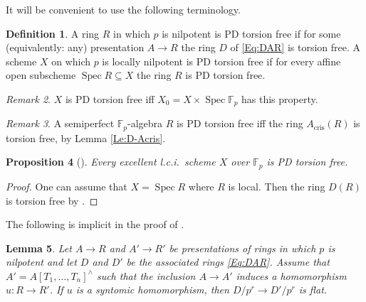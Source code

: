 \documentclass[a4paper,11pt]{article}
\theoremstyle{plain}
\newtheorem{Lemma}{Lemma}
\newtheorem{Prop}[Lemma]{Proposition}
\theoremstyle{definition}
\newtheorem{Defn}[Lemma]{Definition}
\theoremstyle{remark}
\newtheorem{Remark}[Lemma]{Remark}
\theoremstyle{definition}
\numberwithin{Lemma}{section}
\numberwithin{Subpoint}{Lemma}
\numberwithin{equation}{section}
\newcommand{\FF}{{\mathbb{F}}}
\DeclareMathOperator{\Spec}{Spec}
\DeclareMathOperator{\cris}{cris}
\newcommand{\chang}[1]{{#1}}
\begin{document}
It will be convenient to use the following terminology.

\begin{Defn}
\label{Def:PD-tor}
A ring $R$ in which $p$ is nilpotent is PD torsion free 
if for some (equivalently: any) presentation $A\to R$ the ring $D$
of \eqref{Eq:DAR} is torsion free.
A scheme $X$ on which $p$ is locally nilpotent is PD torsion free 
if for \chang{every} affine open subscheme $\Spec R\subseteq X$ 
the ring $R$ is PD torsion free.
\end{Defn}

\begin{Remark}
\chang{$X$ is PD torsion free iff $X_0=X\times\Spec\FF_p$
has this property.}
\end{Remark}

\begin{Remark}
\label{Re:semiperf-pdtorsion}
\chang{A semiperfect $\FF_p$-algebra $R$ is PD torsion free iff the ring $A_{\cris}(R)$ is torsion free, by Lemma \ref{Le:D-Acris}.}
\end{Remark}

\begin{Prop}[\cite{Jong-Messing}]
\label{Pr:PD-tor-lci}
\chang{Every} excellent l.c.i.\ scheme $X$ over $\FF_p$ is PD torsion free.
\end{Prop}

\begin{proof}
One can assume that $X=\Spec R$ where $R$ is local.
Then the ring $D(R)$ is torsion free by 
\cite[Lemma 4.7]{Jong-Messing}.
\end{proof}

The following is implicit in the proof of \cite[Lemma 4.7]{Jong-Messing}.

\begin{Lemma}
\label{Le:DAR-lci}
Let $A\to R$ and $A'\to R'$ be presentations 
of rings in which $p$ is nilpotent 
and let $D$ and $D'$ be the associated rings \eqref{Eq:DAR}.
Assume that $A'=A[T_1,\ldots,T_n]^\wedge$ such that the
inclusion $A\to A'$ induces a homomorphism $u:R\to R'$.
If $u$ is a syntomic homomorphism, then $D/p^r\to D'/p^r$ is flat.
\end{Lemma}
\end{document}
